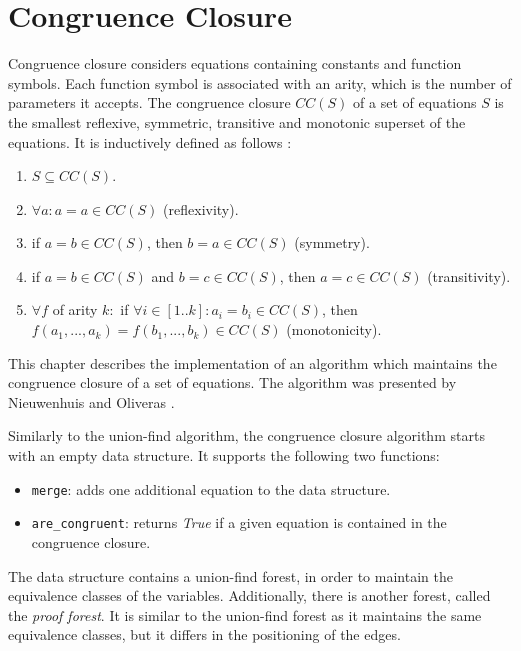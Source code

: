 
\chapter{Congruence Closure} \label{chapter:congruence_closure}

Congruence closure considers equations containing constants and function symbols. Each function symbol is associated with an arity, which is the number of parameters it accepts. The congruence closure $CC(S)$ of a set of equations $S$ is the smallest reflexive, symmetric, transitive and monotonic superset of the equations. It is inductively defined as follows \cite{congruenceclosure-ac}:

\begin{enumerate}[label=(\roman*)]
\itemsep0em
    \item $S \subseteq CC(S)$.
    \item $\forall a: a = a \in CC(S)$ (reflexivity).
    \item if $a = b \in CC(S)$, then $b = a \in CC(S)$ (symmetry).
    \item if $a = b \in CC(S)$ and $b = c \in CC(S)$, then $a = c \in CC(S)$ (transitivity).
    \item $\forall f$ of arity $k :$ if $\forall i \in [1..k]: a_i = b_i \in CC(S)$, then $f(a_1, ..., a_k) = f(b_1,..., b_k) \in CC(S)$ (monotonicity).
\end{enumerate}

This chapter describes the implementation of an algorithm which maintains the congruence closure of a set of equations.
The algorithm was presented by Nieuwenhuis and Oliveras \cite{Nieuwenhuis}.

Similarly to the union-find algorithm, the congruence closure algorithm starts with an empty data structure. It supports the following two functions:
\begin{itemize}
    \item \lstinline|merge|: adds one additional equation to the data structure.
    \item  \lstinline|are_congruent|: returns \emph{True} if a given equation is contained in the congruence closure.
\end{itemize}

The data structure contains a union-find forest, in order to maintain the equivalence classes of the variables. Additionally, there is another forest, called the \emph{proof forest}. It is similar to the union-find forest as it maintains the same equivalence classes, but it differs in the positioning of the edges.

